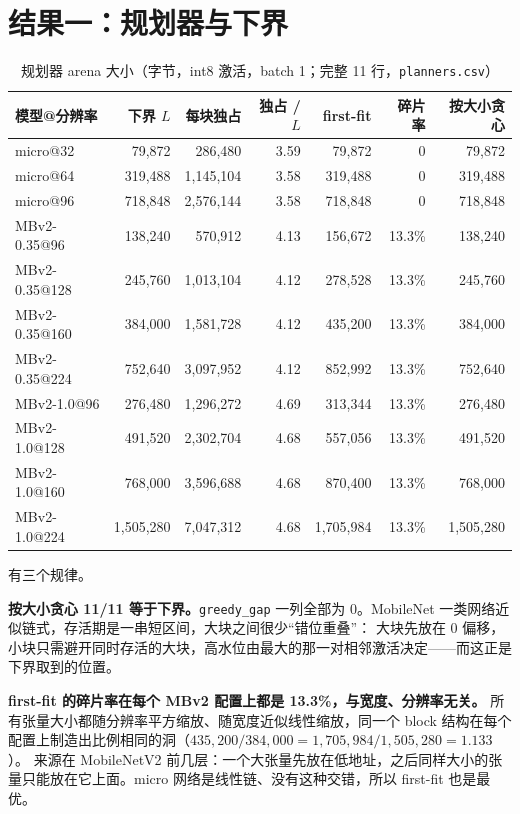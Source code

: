 \documentclass[11pt,a4paper]{ctexart}
\begin{document}
\section{结果一：规划器与下界}\label{sec:planners}

\begin{table}[H]
\centering\small
\caption{规划器 arena 大小（字节，int8 激活，batch 1；完整 11 行，\texttt{planners.csv}）}\label{tab:planners}
\begin{tabular}{lrrrrrr}
\toprule
模型@分辨率 & 下界 $L$ & 每块独占 & 独占 / $L$ & first-fit & 碎片率 & 按大小贪心 \\
\midrule
micro@32 & 79,872 & 286,480 & 3.59 & 79,872 & 0 & 79,872 \\
micro@64 & 319,488 & 1,145,104 & 3.58 & 319,488 & 0 & 319,488 \\
micro@96 & 718,848 & 2,576,144 & 3.58 & 718,848 & 0 & 718,848 \\
\midrule
MBv2-0.35@96 & 138,240 & 570,912 & 4.13 & 156,672 & 13.3\% & 138,240 \\
MBv2-0.35@128 & 245,760 & 1,013,104 & 4.12 & 278,528 & 13.3\% & 245,760 \\
MBv2-0.35@160 & 384,000 & 1,581,728 & 4.12 & 435,200 & 13.3\% & 384,000 \\
MBv2-0.35@224 & 752,640 & 3,097,952 & 4.12 & 852,992 & 13.3\% & 752,640 \\
\midrule
MBv2-1.0@96 & 276,480 & 1,296,272 & 4.69 & 313,344 & 13.3\% & 276,480 \\
MBv2-1.0@128 & 491,520 & 2,302,704 & 4.68 & 557,056 & 13.3\% & 491,520 \\
MBv2-1.0@160 & 768,000 & 3,596,688 & 4.68 & 870,400 & 13.3\% & 768,000 \\
MBv2-1.0@224 & 1,505,280 & 7,047,312 & 4.68 & 1,705,984 & 13.3\% & 1,505,280 \\
\bottomrule
\end{tabular}
\end{table}

有三个规律。

\textbf{按大小贪心 11/11 等于下界。}\texttt{greedy\_gap} 一列全部为 0。MobileNet 一类网络近似链式，存活期是一串短区间，大块之间很少“错位重叠”：
大块先放在 0 偏移，小块只需避开同时存活的大块，高水位由最大的那一对相邻激活决定——而这正是下界取到的位置。

\textbf{first-fit 的碎片率在每个 MBv2 配置上都是 13.3\%，与宽度、分辨率无关。}
所有张量大小都随分辨率平方缩放、随宽度近似线性缩放，同一个 block 结构在每个配置上制造出比例相同的洞（$435{,}200/384{,}000 = 1{,}705{,}984/1{,}505{,}280 = 1.133$）。
来源在 MobileNetV2 前几层：一个大张量先放在低地址，之后同样大小的张量只能放在它上面。micro 网络是线性链、没有这种交错，所以 first-fit 也是最优。
\end{document}
